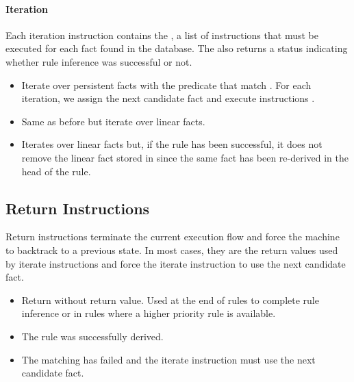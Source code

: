 \paragraph{Iteration} Each iteration instruction contains the , a list of instructions
that must be executed for each fact found in the database. The  also
returns a status indicating whether rule inference was successful or not.

\begin{itemize}
   \item {}

   Iterate over persistent facts with the predicate  that match
   . For each iteration, we assign  the next candidate fact
   and execute instructions .

   \item {}

   Same as before but iterate over linear facts.

   \item {}

   Iterates over linear facts but, if the rule has been successful, it does not
   remove the linear fact stored in  since the same fact has been
   re-derived in the head of the rule.

\end{itemize}

\subsection{Return Instructions}

Return instructions terminate the current execution flow and force the machine
to backtrack to a previous state. In most cases, they are the return values used by iterate
instructions and force the iterate instruction to use the next candidate fact.

\begin{itemize}
   \item {}

      Return without return value. Used at the end of rules to complete rule
      inference or in rules where a higher priority rule is available.

   \item {}

      The rule was successfully derived.

   \item {}

      The matching has failed and the iterate instruction must use the next
      candidate fact.

\end{itemize}

